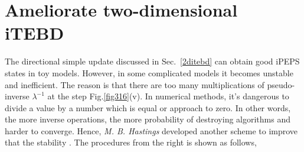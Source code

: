 \section{Ameliorate two-dimensional iTEBD}
\label{2dhastin}

The directional simple update discussed in Sec.~\ref{2ditebd} can obtain good iPEPS states in toy models. However, in some complicated models it becomes unstable and inefficient. The reason is that there are too many multiplications of pseudo-inverse $\lambda^{-1}$ at the step Fig.\ref{fig316}(v). In numerical methods, it's dangerous to divide a value by a number which is equal or approach to zero. In other words, the more inverse operations, the more probability of destroying algorithms and harder to converge. Hence, \textit{M. B. Hastings} developed another scheme to improve that the stability \cite{light_hastings}. The procedures from the right is shown as follows,

